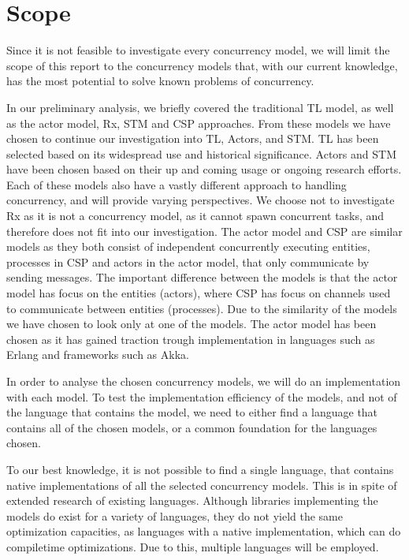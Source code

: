 \section{Scope}
\label{sec:intro_scope}
Since it is not feasible to investigate every concurrency model, we will limit the scope of this report to the concurrency models that, with our current knowledge, has the most potential to solve known problems of concurrency.

In our preliminary analysis, we briefly covered the traditional \ac{TL} model, as well as the actor model, \ac{Rx}, \ac{STM} and \ac{CSP} approaches. From these models we have chosen to continue our investigation into \ac{TL}, Actors, and \ac{STM}. \ac{TL} has been selected based on its widespread use and historical significance. Actors and \ac{STM} have been chosen based on their up and coming usage or ongoing research efforts. Each of these models also have a vastly different approach to handling concurrency, and will provide varying perspectives. We choose not to investigate \ac{Rx} as it is not a concurrency model, as it cannot spawn concurrent tasks, and therefore does not fit into our investigation. The actor model and CSP are similar models as they both consist of independent concurrently executing entities, processes in CSP and actors in the actor model, that only communicate by sending messages. The important difference between the models is that the actor model has focus on the entities (actors), where CSP has focus on channels used to communicate between entities (processes)\cite[p. 153]{sevenModels}. Due to the similarity of the models we have chosen to look only at one of the models. The actor model has been chosen as it has gained  traction trough implementation in languages such as Erlang and frameworks such as Akka.

In order to analyse the chosen concurrency models, we will do an implementation with each model. To test the implementation efficiency of the models, and not of the language that contains the model, we need to either find a language that contains all of the chosen models, or a common foundation for the languages chosen. 

To our best knowledge, it is not possible to find a single language, that contains native implementations of all the selected concurrency models. This is in spite of extended research of existing languages. Although libraries implementing the models do exist for a variety of languages, they do not yield the same optimization capacities, as languages with a native implementation, which can do compiletime optimizations. Due to this, multiple languages will be employed. 

